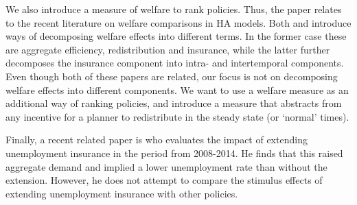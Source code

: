 \documentclass[../HAFiscal]{subfiles}
\begin{document}
We also introduce a measure of welfare to rank policies. Thus, the paper relates to the recent literature on welfare comparisons in HA models. Both \cite{bhandari2021efficiency} and \cite{davila2022welfare} introduce ways of decomposing welfare effects into different terms. In the former case these are aggregate efficiency, redistribution and insurance, while the latter further decomposes the insurance component into intra- and intertemporal components. Even though both of these papers are related, our focus is not on decomposing welfare effects into different components. We want to use a welfare measure as an additional way of ranking policies, and introduce a measure that abstracts from any incentive for a planner to redistribute in the steady state (or `normal' times).

Finally, a recent related paper is \cite{kekre2022unemployment} who evaluates the impact of extending unemployment insurance in the period from 2008-2014. He finds that this raised aggregate demand and implied a lower unemployment rate than without the extension. However, he does not attempt to compare the stimulus effects of extending unemployment insurance with other policies. 

\onlyinsubfile{}
\end{document}
